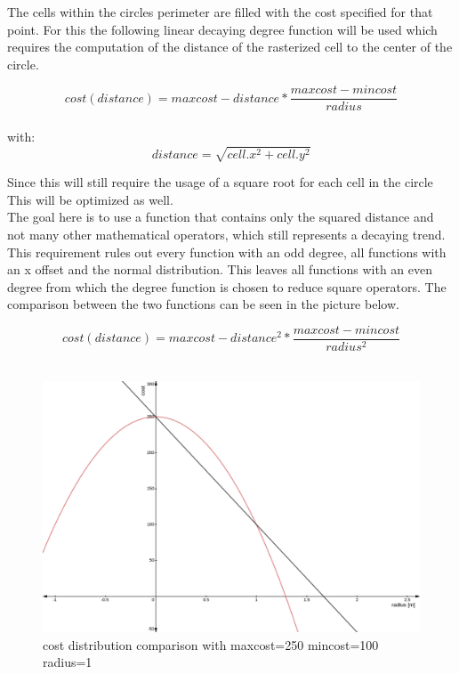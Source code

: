 The cells within the circles perimeter are filled with the cost specified for that point. For this the following linear decaying  degree function will be used which requires the computation of the distance of the rasterized cell to the center of the circle.

\[cost(distance)=maxcost-distance*\frac{maxcost-mincost}{radius}\]\\
with: \[distance=\sqrt{cell.x^2+cell.y^2}\]

 Since this will still require the usage of a square root for each cell in the circle This will be optimized as well.\\

The goal here is to use a function that contains only the squared distance and not many other mathematical operators, which still represents a decaying trend. This requirement rules out every function with an odd degree, all functions with an x offset and the normal distribution. This leaves all functions with an even degree from which the  degree function is chosen to reduce square operators. The comparison between the two functions can be seen in the picture below.

\[cost(distance)=maxcost-distance^2*\frac{maxcost-mincost}{radius^2}\]\\

\begin{figure}[H]
	\begin{center}
	\includegraphics[width=140mm]{Pictures/linear cost comparison}
	\caption{cost distribution comparison with maxcost=250 mincost=100 radius=1}
	\end{center}
\end{figure}

